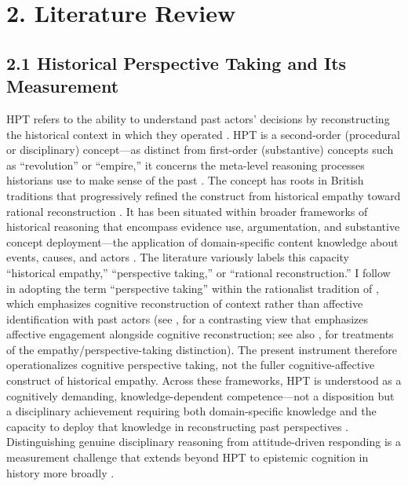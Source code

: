 \documentclass[PCJ,Unicode,screen,mode=plain]{cedram}
\begin{document}
\section*{2. Literature Review}\label{literature-review}

\subsection*{2.1 Historical Perspective Taking and Its Measurement}\label{historical-perspective-taking-and-its-measurement}

HPT refers to the ability to understand past actors' decisions by
reconstructing the historical context in which they operated \citep{Hartmann_Hasselhorn2008Historical,Lee_Ashby2001Empathy}. HPT is a second-order
(procedural or disciplinary) concept---as distinct from first-order
(substantive) concepts such as ``revolution'' or ``empire,'' it
concerns the meta-level reasoning processes historians use to make
sense of the past \citep{Seixas_Peck2004Teaching}. The concept has roots in
British traditions that progressively refined the construct from
historical empathy \citep{Ashby1987,Shemilt1984} toward
rational reconstruction \citep{Lee_Ashby2001Empathy}. It has been situated
within broader frameworks of historical reasoning that encompass
evidence use, argumentation, and substantive concept deployment---the
application of domain-specific content knowledge about events, causes,
and actors \citep{vanBoxtel_vanDrie2018Historical,VanDrie_VanBoxtel2008Historical,VanSledright2014Assessing}. The literature variously labels this
capacity ``historical empathy,'' ``perspective taking,'' or ``rational
reconstruction.'' I follow \citet{Hartmann_Hasselhorn2008Historical} in adopting
the term ``perspective taking'' within the rationalist tradition of
\citet{Lee_Ashby2001Empathy}, which emphasizes cognitive reconstruction of
context rather than affective identification with past actors (see
\citealp{Barton_Levstik2004Teaching}, for a contrasting view that emphasizes
affective engagement alongside cognitive reconstruction; see also
\citealp{Endacott_Brooks2013An_Updated,Endacott2014Negotiating}, for
treatments of the empathy/perspective-taking distinction). The present
instrument therefore operationalizes cognitive perspective taking, not
the fuller cognitive-affective construct of historical empathy. Across these frameworks, HPT
is understood as a cognitively demanding, knowledge-dependent
competence---not a disposition but a disciplinary achievement requiring
both domain-specific knowledge and the capacity to deploy that
knowledge in reconstructing past perspectives \citep{Chapman2021Introduction,VanSledright2014Assessing,Wineburg2001Historical}. Distinguishing genuine
disciplinary reasoning from attitude-driven responding is a
measurement challenge that extends beyond HPT to epistemic cognition in
history more broadly \citep{Maggioni_et_al2009Walking}.
\end{document}
